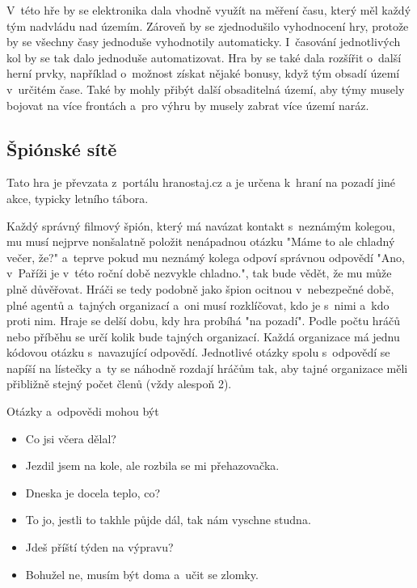 V~této hře by se elektronika dala vhodně využít na měření času, který měl každý tým nadvládu nad územím.
Zároveň by se zjednodušilo vyhodnocení hry, protože by se všechny časy jednoduše vyhodnotily automaticky.
I~časování jednotlivých kol by se tak dalo jednoduše automatizovat.
Hra by se také dala rozšířit o~další herní prvky, například o~možnost získat nějaké bonusy, když tým obsadí území v~určitém čase.
Také by mohly přibýt další obsaditelná území, aby týmy musely bojovat na více frontách a~pro výhru by musely zabrat více území naráz.

\subsection{Špiónské sítě \label{SpionskeSite}}
Tato hra je převzata z~portálu hranostaj.cz \cite{SpionskeSite} a je určena k~hraní na pozadí jiné akce, typicky letního tábora.

Každý správný filmový špión, který má navázat kontakt s~neznámým kolegou, mu musí nejprve nonšalatně položit nenápadnou otázku "Máme to ale chladný večer, že?" a~teprve pokud mu neznámý kolega odpoví správnou odpovědí "Ano, v~Paříži je v~této roční době nezvykle chladno.", tak bude vědět, že mu může plně důvěřovat.
Hráči se tedy podobně jako špion ocitnou v~nebezpečné době, plné agentů a~tajných organizací a~oni musí rozklíčovat, kdo je s~nimi a~kdo proti nim.
Hraje se delší dobu, kdy hra probíhá "na pozadí". 
Podle počtu hráčů nebo příběhu se určí kolik bude tajných organizací. 
Každá organizace má jednu kódovou otázku s~navazující odpovědí. 
Jednotlivé otázky spolu s~odpovědí se napíší na lístečky a~ty se náhodně rozdají hráčům tak, aby tajné organizace měli přibližně stejný počet členů (vždy alespoň 2).

Otázky a~odpovědi mohou být
\begin{itemize}
    \item Co jsi včera dělal?
    \item Jezdil jsem na kole, ale rozbila se mi přehazovačka.
\end{itemize}

\begin{itemize}
    \item Dneska je docela teplo, co?
    \item To jo, jestli to takhle půjde dál, tak nám vyschne studna.
\end{itemize}

\begin{itemize}
    \item Jdeš příští týden na výpravu?
    \item Bohužel ne, musím být doma a~učit se zlomky.
\end{itemize}

